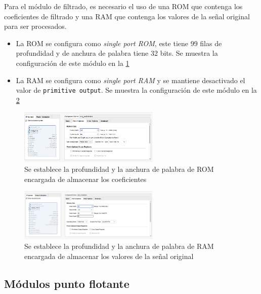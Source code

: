 Para el módulo de filtrado, es necesario el uso de una ROM que contenga los coeficientes de filtrado y una RAM que contenga los valores de la señal original para ser procesados.

\begin{itemize}
\item La ROM se configura como \textit{single port ROM}, este tiene 99 filas de profundidad y de anchura de palabra tiene 32 bits. Se muestra la configuración de este módulo en la \cref{fig:romcoeficientesconf}
\item La RAM se configura como \textit{single port RAM} y se mantiene desactivado el valor de \texttt{primitive output}. Se muestra la configuración de este módulo en la \cref{fig:rammuestrasconf}

\end{itemize}

\begin{figure}[h!]
    \centering
    \includegraphics[width=0.6\textwidth]{./Images/img_implementacion_hw/romcoeficientesconf.png}
    \caption{Se establece la profundidad y la anchura de palabra de ROM encargada de almacenar los coeficientes}
    \label{fig:romcoeficientesconf}
\end{figure}

\begin{figure}[h!]
    \centering
    \includegraphics[width=0.6\textwidth]{./Images/img_implementacion_hw/rammuestrasconf.png}
    \caption{Se establece la profundidad y la anchura de palabra de RAM encargada de almacenar los valores de la señal original}
    \label{fig:rammuestrasconf}
\end{figure}
\FloatBarrier

\subsection{Módulos punto flotante}

